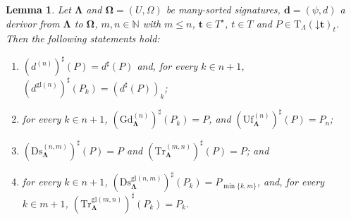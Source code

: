 \documentclass[a4paper, reqno
]{amsart}
\newcommand{\vs}[1]{\mathbin{\downarrow}#1}
\newcommand{\sig}[1]{\mathbf{#1}}             %
\newcommand{\gl}{\mathrm{gl}}                %
\newcommand{\Gd}{\mathrm{Gd}}
\newcommand{\Uf}{\mathrm{Uf}}
\newcommand{\Ds}{\mathrm{Ds}}
\newcommand{\Tr}{\mathrm{Tr}}
\theoremstyle{plain}
\newtheorem{lemma}[theorem]{Lemma}
\theoremstyle{definition}
\begin{document}
\begin{lemma}\label{LChangeSigTerms}
Let $\sig{\Lambda}$ and $\sig{\Omega}=(U,\Omega)$ be many-sorted signatures, $\mathbf{d}=(\psi,d)$ a derivor from $\sig{\Lambda}$ to $\sig{\Omega}$, $m,n\in\mathbb{N}$ with $m\leq n$, $\mathbf{t}\in T^{\star}$, $t\in T$ and $P\in\mathrm{T}_{\Lambda}(\vs{\mathbf{t}})_{t}$.
Then the following statements hold:
\begin{enumerate}
\item $(d^{(n)})^{\sharp}(P)=d^{\sharp}(P)$ and, for every $k\in n+1$, $(d^{\gl(n)})^{\sharp}(P_{k})=(d^{\sharp}(P))_{k}$;
\item for every $k\in n+1$, $(\Gd^{(n)}_{\sig{\Lambda}})^{\sharp}(P_{k})=P$, and $(\Uf^{(n)}_{\sig{\Lambda}})^{\sharp}(P)=P_{n}$;
\item $(\Ds^{(n,m)}_{\sig{\Lambda}})^{\sharp}(P)=P$ and $(\Tr^{(m,n)}_{\sig{\Lambda}})^{\sharp}(P)=P$; and
\item for every $k\in n+1$, $(\Ds^{\gl(n,m)}_{\sig{\Lambda}})^{\sharp}(P_{k})=P_{\min\{k,m\}}$, and, for every $k\in m+1$, $(\Tr^{\gl(m,n)}_{\sig{\Lambda}})^{\sharp}(P_{k})=P_{k}$.
\end{enumerate}
\end{lemma}
\end{document}
